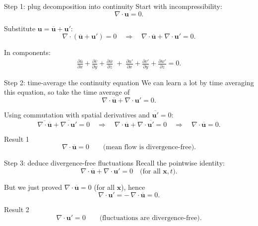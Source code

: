 \documentclass[aspectratio=169]{beamer}
\newcommand{\uu}{\bm{u}}
\newcommand{\x}{\bm{x}}
\newcommand{\avg}[1]{\overline{#1}}
\newcommand{\up}{\uu'}
\newcommand{\ubar}{\avg{\uu}}
\begin{document}
\begin{frame}{Step 1: plug decomposition into continuity}
Start with incompressibility:
\[
\nabla\cdot\uu = 0.
\]

Substitute $\uu=\ubar+\up$:
\[
\nabla\cdot(\ubar+\up)=0
\quad\Rightarrow\quad
\nabla\cdot\ubar + \nabla\cdot\up = 0.
\]

In components:
\begin{align*}
\frac{\partial \avg{u}}{\partial x} + \frac{\partial \avg{v}}{\partial y} + \frac{\partial \avg{w}}{\partial z}
\;+\;
\frac{\partial u'}{\partial x} + \frac{\partial v'}{\partial y} + \frac{\partial w'}{\partial z}
=0.
\end{align*}

\end{frame}

\begin{frame}{Step 2: time-average the continuity equation}
We can learn a lot by time averaging this equation, so take the time average of
\[
\nabla\cdot\ubar + \nabla\cdot\up = 0.
\]

Using commutation with spatial derivatives and $\avg{\up}=0$:
\[
\avg{\nabla\cdot\ubar} + \avg{\nabla\cdot\up} = 0
\quad\Rightarrow\quad
\nabla\cdot\ubar + \nabla\cdot\avg{\up}=0
\quad\Rightarrow\quad
\nabla\cdot\ubar = 0.
\]

\begin{block}{Result 1}
\[
\nabla\cdot\ubar = 0 \qquad\text{(mean flow is divergence-free).}
\]
\end{block}

\end{frame}

\begin{frame}{Step 3: deduce divergence-free fluctuations}
Recall the pointwise identity:
\[
\nabla\cdot\ubar + \nabla\cdot\up = 0 \quad\text{(for all $\x,t$)}.
\]

But we just proved $\nabla\cdot\ubar=0$ (for all $\x$), hence
\[
\nabla\cdot\up = -\,\nabla\cdot\ubar = 0.
\]

\begin{block}{Result 2}
\[
\nabla\cdot\up = 0 \qquad\text{(fluctuations are divergence-free).}
\]
\end{block}

\end{frame}
\end{document}
